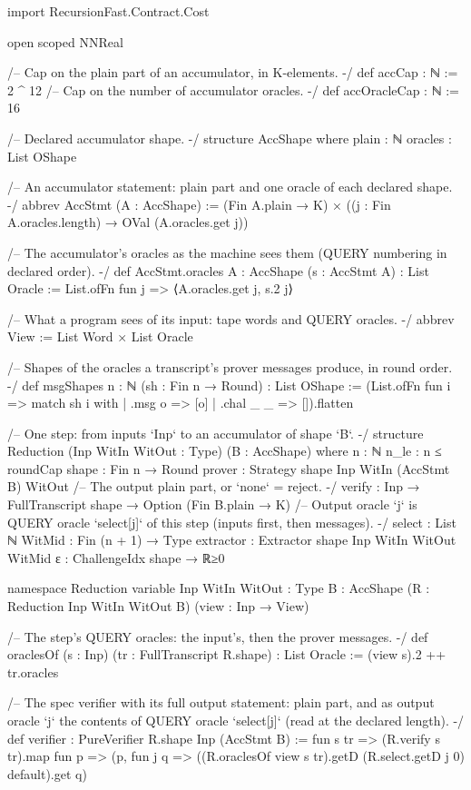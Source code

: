 \begin{leancode}[fontsize=\scriptsize,label={\footnotesize Contract/Accumulation.lean}]
import RecursionFast.Contract.Cost

open scoped NNReal

/-- Cap on the plain part of an accumulator, in K-elements. -/
def accCap : ℕ := 2 ^ 12
/-- Cap on the number of accumulator oracles. -/
def accOracleCap : ℕ := 16

/-- Declared accumulator shape. -/
structure AccShape where
  plain : ℕ
  oracles : List OShape

/-- An accumulator statement: plain part and one oracle of each declared shape. -/
abbrev AccStmt (A : AccShape) := (Fin A.plain → K) × ((j : Fin A.oracles.length) → OVal (A.oracles.get j))

/-- The accumulator's oracles as the machine sees them (QUERY numbering in declared order). -/
def AccStmt.oracles {A : AccShape} (s : AccStmt A) : List Oracle := List.ofFn fun j => ⟨A.oracles.get j, s.2 j⟩

/-- What a program sees of its input: tape words and QUERY oracles. -/
abbrev View := List Word × List Oracle

/-- Shapes of the oracles a transcript's prover messages produce, in round order. -/
def msgShapes {n : ℕ} (sh : Fin n → Round) : List OShape :=
  (List.ofFn fun i => match sh i with | .msg o => [o] | .chal _ _ => []).flatten

/-- One step: from inputs `Inp` to an accumulator of shape `B`. -/
structure Reduction (Inp WitIn WitOut : Type) (B : AccShape) where
  n : ℕ
  n_le : n ≤ roundCap
  shape : Fin n → Round
  prover : Strategy shape Inp WitIn (AccStmt B) WitOut
  /-- The output plain part, or `none` = reject. -/
  verify : Inp → FullTranscript shape → Option (Fin B.plain → K)
  /-- Output oracle `j` is QUERY oracle `select[j]` of this step (inputs first, then messages). -/
  select : List ℕ
  WitMid : Fin (n + 1) → Type
  extractor : Extractor shape Inp WitIn WitOut WitMid
  ε : ChallengeIdx shape → ℝ≥0

namespace Reduction
variable {Inp WitIn WitOut : Type} {B : AccShape} (R : Reduction Inp WitIn WitOut B) (view : Inp → View)

/-- The step's QUERY oracles: the input's, then the prover messages. -/
def oraclesOf (s : Inp) (tr : FullTranscript R.shape) : List Oracle := (view s).2 ++ tr.oracles

/-- The spec verifier with its full output statement: plain part, and as output oracle `j`
the contents of QUERY oracle `select[j]` (read at the declared length). -/
def verifier : PureVerifier R.shape Inp (AccStmt B) :=
  fun s tr => (R.verify s tr).map fun p =>
    (p, fun j q => ((R.oraclesOf view s tr).getD (R.select.getD j 0) default).get q)


\end{leancode}
